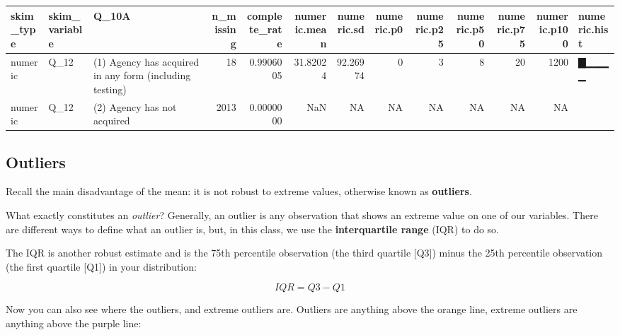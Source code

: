 \documentclass[
]{book}
\begin{document}
\begin{tabular}{l|l|l|r|r|r|r|r|r|r|r|r|l}
\hline
skim\_type & skim\_variable & Q\_10A & n\_missing & complete\_rate & numeric.mean & numeric.sd & numeric.p0 & numeric.p25 & numeric.p50 & numeric.p75 & numeric.p100 & numeric.hist\\
\hline
numeric & Q\_12 & (1) Agency has acquired in any form (including testing) & 18 & 0.9906005 & 31.82024 & 92.26974 & 0 & 3 & 8 & 20 & 1200 & ▇▁▁▁▁\\
\hline
numeric & Q\_12 & (2) Agency has not acquired & 2013 & 0.0000000 & NaN & NA & NA & NA & NA & NA & NA & \\
\hline
\end{tabular}

\hypertarget{outliers}{%
\subsection{Outliers}\label{outliers}}

Recall the main disadvantage of the mean: it is not robust to extreme values, otherwise known as \textbf{outliers}.

What exactly constitutes an \emph{outlier}? Generally, an outlier is any observation that shows an extreme value on one of our variables. There are different ways to define what an outlier is, but, in this class, we use the \textbf{interquartile range} (IQR) to do so.

The IQR is another robust estimate and is the 75th percentile observation (the third quartile {[}Q3{]}) minus the 25th percentile observation (the first quartile {[}Q1{]}) in your distribution:

\[ IQR= Q3 - Q1 \]

Now you can also see where the outliers, and extreme outliers are. Outliers are anything above the orange line, extreme outliers are anything above the purple line:
\end{document}
